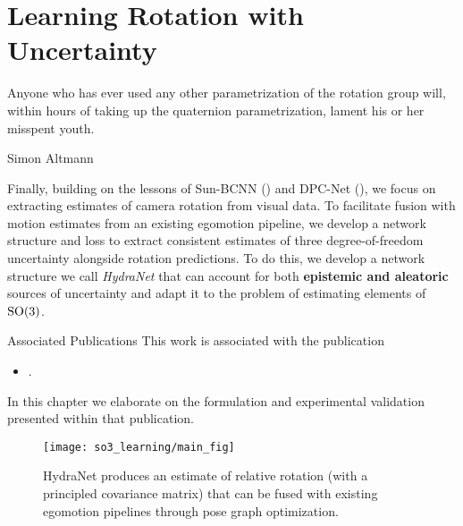 \chapter{Learning Rotation with Uncertainty}
\label{ch:hydranet}
\epigraph{Anyone who has ever used any other parametrization of the rotation group will, within hours of taking up the quaternion parametrization, lament his or her misspent youth.}{Simon Altmann}


Finally, building on the lessons of Sun-BCNN () and DPC-Net (), we focus on extracting estimates of camera rotation from visual data. To facilitate fusion with motion estimates from an existing egomotion pipeline, we develop a network structure and loss to extract consistent estimates of three degree-of-freedom uncertainty alongside rotation predictions. To do this, we develop a network structure we call \textit{HydraNet} that can account for both \textbf{epistemic and aleatoric} sources of uncertainty and adapt it to the problem of estimating elements of $\mathrm{SO}(3)$. 

\begin{remark}{Associated Publications}
This work is associated with the publication
\begin{itemize}
\item {}.
\end{itemize}
In this chapter we elaborate on the formulation and experimental validation presented within that publication.
\end{remark}

\begin{figure}[h!]
	\centering
	\texttt{[image: so3\_learning/main\_fig]}
	\caption{HydraNet produces an estimate of relative rotation (with a principled covariance matrix) that can be fused with existing egomotion pipelines through pose graph optimization.}
	\label{fig:hydranet_fusion_fig}
\end{figure}

